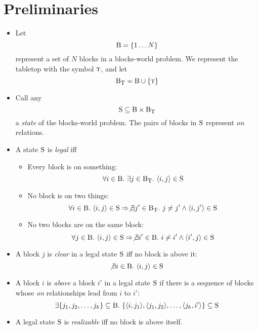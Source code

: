 \documentclass{article}
\newcommand{\implies}{\Rightarrow}
\newcommand{\have}{{.~}}
\newcommand{\bstate}{{\mbox{\cal S}}}
\newcommand{\blocks}{{\mbox{\cal B}}}
\newcommand{\tabtop}{{\mbox{\sc t}}}
\newcommand{\tblocks}{{\blocks_\tabtop}}
\begin{document}
\section{Preliminaries}

\begin{itemize}
\item Let
  $$ \blocks = \{ 1 \ldots N \} $$
represent a set of $N$ blocks in a blocks-world problem.
We represent the tabletop with the symbol $\tabtop$, and
let
  $$ \tblocks = \blocks \cup \{ \tabtop \} $$
  
\item Call any 
  $$ \bstate \subseteq \blocks \times \tblocks $$
a {\em state} of the blocks-world problem. The pairs of blocks in
$\bstate$ represent {\em on} relations.

\item A state $\bstate$ is {\em legal} iff
  \begin{itemize}
  \item  Every block is on something: $$
    \forall i \in \blocks \have
      \exists j \in \tblocks \have
	\langle i , j \rangle \in \bstate
  $$
  \item No block is on two things: $$
    \forall i \in \blocks \have
      \langle i , j \rangle \in \bstate \implies
      \not \exists j' \in \tblocks \have
	j \neq j' \wedge \langle i , j' \rangle \in \bstate
  $$
  \item No two blocks are on the same block: $$
    \forall j \in \blocks \have
      \langle i , j \rangle \in \bstate \implies
      \not \exists i' \in \blocks \have
	i \neq i' \wedge \langle i' , j \rangle \in \bstate
  $$
  \end{itemize}
  
\item A block $j$ is {\em clear} in a legal state $\bstate$ iff no block is above it:
  $$ \not \exists i \in \blocks \have \langle i , j \rangle \in \bstate $$

\item A block $i$ is {\em above} a block $i'$ in a legal
state $\bstate$ if there is a sequence
of blocks whose {\em on} relationships lead from $i$ to $i'$: $$
  \exists \{ j_1 , j_2 , \ldots , j_k \} \subseteq \blocks \have
    \{ \langle i , j_1 \rangle , \langle j_1 , j_2 \rangle ,
       \ldots , \langle j_k , i' \rangle \} \subseteq \bstate
$$

\item A legal state $\bstate$ is {\em realizable} iff no block
is above itself.


\end{itemize}
\end{document}
